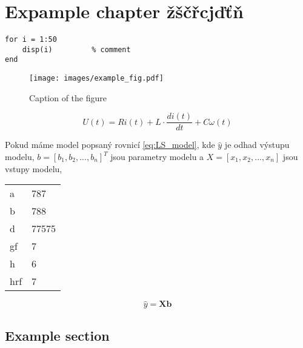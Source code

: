 \chapter{Expample chapter žščřcjďťň}
\label{chap:Expample}

\lipsum[1]

\begin{lstlisting}
for i = 1:50
	disp(i)			% comment         
end
\end{lstlisting}

\begin{figure}[tbp] 
	\begin{center}
		\texttt{[image: images/example\_fig.pdf]}
	\end{center}
	\caption[Caption in list of figures]{Caption of the figure}
	\label{fig:figurelabel}
\end{figure}	

\lipsum[2]

\begin{equation}\label{eq:DCmot}
U(t) = Ri(t) + L\cdot\frac{di(t)}{dt} + C\omega(t)
\end{equation}

Pokud máme model popsaný rovnicí \ref{eq:LS_model}, kde \boldmath $\hat{y}$ je odhad výstupu modelu, $b = \left[b_1,b_2,...,b_n\right]^T$ jsou parametry modelu a $X = \left[x_1,x_2,...,x_n\right]$ jsou vstupy modelu, \unboldmath

\begin{center}
	\begin{tabular}{|l|l|}
		&  \\ 
		\hline 
		a & 787 \\ 
		b & 788 \\ 
		d & 77575 \\ 
		gf & 7 \\ 
		h & 6 \\ 
		hrf & 7 \\ 
	\end{tabular} 
\end{center}


\begin{equation}\label{eq:LS_model}
\hat{y} = \bm{X} \bm{b}
\end{equation}

\section{Example section}
\label{sec:Example-section}

